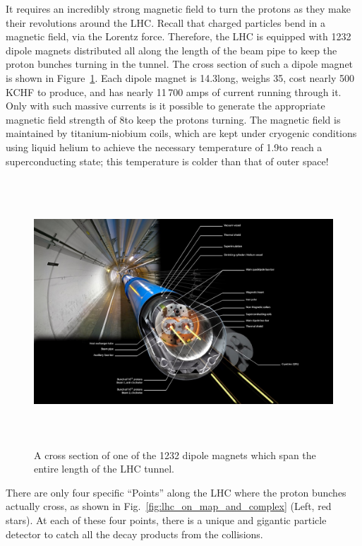 It requires an incredibly strong magnetic field to turn the protons as they make their revolutions around the LHC. 
Recall that charged particles bend in a magnetic field, via the Lorentz force. 
Therefore, the LHC is equipped with 1232 dipole magnets distributed all along the length of the beam pipe to keep the proton bunches turning in the tunnel.
The cross section of such a dipole magnet is shown in Figure~\ref{fig:lhc_dipole_xs}.
Each dipole magnet is 14.3\meter long, weighs 35\tonne, cost nearly 500\,KCHF to produce, and has nearly 11\,700 amps of current running through it. 
Only with such massive currents is it possible to generate the appropriate magnetic field strength of 8\tesla to keep the protons turning. 
The magnetic field is maintained by titanium-niobium coils, which are kept under cryogenic conditions using liquid helium to achieve the necessary temperature of 1.9\kelvin to reach a superconducting state; 
this temperature is colder than that of outer space!
\begin{figure}[pbth]
\centering
\includegraphics[width=15cm,height=10cm,keepaspectratio]{figures/lhc/lhc_dipole_xs.jpg}
    \caption{
    A cross section of one of the 1232 dipole magnets which span the entire length of the LHC tunnel.} 
    \label{fig:lhc_dipole_xs}
\end{figure}

There are only four specific ``Points'' along the LHC where the proton bunches actually cross, as shown in Fig.~\ref{fig:lhc_on_map_and_complex} (Left, red stars).
At each of these four points, there is a unique and gigantic particle detector to catch all the decay products from the \pp collisions. 

